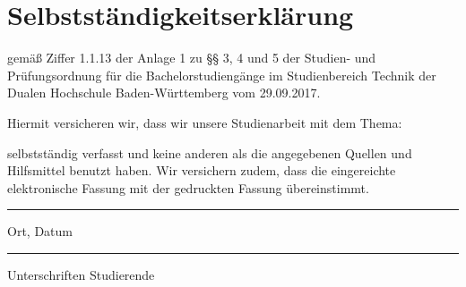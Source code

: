 \section*{\Huge{Selbstständigkeitserklärung}}
gemäß Ziffer 1.1.13 der Anlage 1 zu §§ 3, 4 und 5  der Studien- und Prüfungsordnung für die Bachelorstudiengänge im Studienbereich Technik der Dualen Hochschule Baden-Würt­tem­berg vom 29.09.2017.

\noindent Hiermit versicheren wir, dass wir unsere Studienarbeit mit dem Thema: 
\begin{center}
	\Large\textbf{\vTitel}
\end{center}
selbstständig verfasst und keine anderen als die angegebenen Quellen und Hilfsmittel benutzt haben. Wir versichern zudem, dass die eingereichte elektronische Fassung mit der gedruckten Fassung übereinstimmt.

\vfill
\leavevmode
\newline
\parbox{6cm}{\hrule\strut\centering\footnotesize Ort, Datum} 
\hfill
\parbox{6cm}{\hspace{1pt} \vAbteilung\hrule\strut\centering\footnotesize Unterschriften Studierende }

\newpage